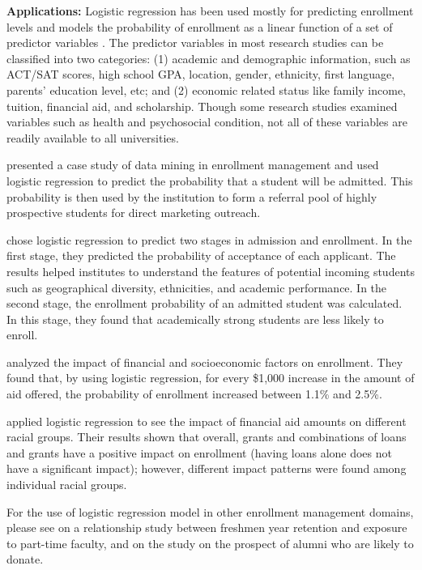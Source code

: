 \documentclass[12pt,english]{report}
\begin{document}
\vspace{0.25in}
\noindent \textbf{Applications:} Logistic regression has been used mostly for
predicting enrollment levels and models the probability of enrollment as a
linear function of a set of predictor variables \citep{lr_summary}. The
predictor variables in most research studies can be classified into two
categories: (1) academic and demographic information, such as ACT/SAT scores,
high school GPA, location, gender, ethnicity, first language, parents'
education level, etc; and (2) economic related status like family income,
tuition, financial aid, and scholarship. Though some research studies examined
variables such as health and psychosocial condition, not all of these variables
are readily available to all universities.

\citet{lr_1_chang} presented a case study of data mining in enrollment
management and used logistic regression to predict the probability that a
student will be admitted. This probability is then used by the institution to
form a referral pool of highly prospective students for direct marketing
outreach.

\citet{lr_2} chose logistic regression to predict two stages in admission and
enrollment. In the first stage, they predicted the probability of acceptance of
each applicant. The results helped institutes to understand the features of
potential incoming students such as geographical diversity, ethnicities, and
academic performance. In the second stage, the enrollment probability of an
admitted student was calculated. In this stage, they found that academically
strong students are less likely to enroll.

\citet{Braunstein1999} analyzed the impact of  financial and socioeconomic
factors on enrollment. They found that, by using logistic regression, for every
\$1,000 increase in the amount of aid offered, the probability of enrollment
increased between 1.1\% and 2.5\%.

\citet{lr_aid2} applied logistic regression to see the impact of financial aid
amounts on different racial groups. Their results shown that overall, grants
and combinations of loans and grants have a positive impact on enrollment
(having loans alone does not have a significant impact); however, different
impact patterns were found among individual racial groups.

For the use of logistic regression model in other enrollment management
domains, please see \citet{lr_retention2} on a relationship study between
freshmen year retention and exposure to part-time faculty, and
\citep{lr_alumni1,lr_alumni2} on the study on the prospect of alumni who are
likely to donate.
\end{document}
